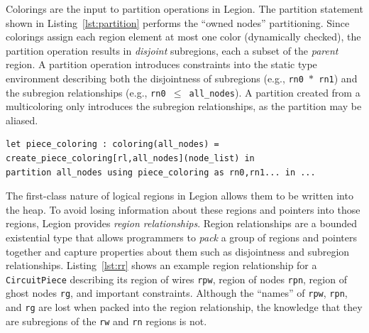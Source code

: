 Colorings are the input to partition operations in Legion.  The partition
statement shown in Listing~\ref{lst:partition} performs the ``owned nodes''
partitioning.    Since colorings assign each region element at most one color
(dynamically checked), the partition operation results in 
{\em disjoint} subregions, each a subset of the {\em parent} region.
A partition operation introduces constraints into the static type environment describing
both the disjointness of subregions (e.g., {\tt rn0 $*$ rn1})
and the subregion relationships
(e.g., {\tt rn0 $\leq$ all\_nodes}).  A partition created from a multicoloring
only introduces the subregion relationships, as the partition may be aliased.




\begin{lstlisting}[label={lst:partition},caption={Partition Operation Example}]
let piece_coloring : coloring(all_nodes) = create_piece_coloring[rl,all_nodes](node_list) in
partition all_nodes using piece_coloring as rn0,rn1... in ...
\end{lstlisting}



The first-class nature of logical regions in Legion allows them to
be written into the heap.  To avoid losing information about these regions and pointers
into those regions, Legion provides {\em region
relationships}.  Region relationships are a bounded existential type
that allows programmers to {\em pack} a group of regions and pointers together and capture
properties about them such as disjointness and subregion relationships.
Listing~\ref{lst:rr} shows an example region relationship for a {\tt CircuitPiece} 
describing its region of wires {\tt rpw}, region of 
nodes {\tt rpn}, region of ghost nodes {\tt rg}, and important constraints.  Although the
``names'' of {\tt rpw}, {\tt rpn}, and {\tt rg} are lost when packed into the region relationship,
the knowledge that they are subregions of the {\tt rw} and {\tt rn} regions is not.

